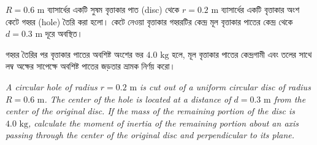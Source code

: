 \documentclass[12pt, a4paper]{article}
\begin{document}
\begin{tcolorbox}[questionbox={প্রশ্ন (Question) 18}]
\noindent
$R = 0.6\text{ m}$ ব্যাসার্ধের একটি সুষম বৃত্তাকার পাত (disc) থেকে $r = 0.2\text{ m}$ ব্যাসার্ধের একটি বৃত্তাকার অংশ কেটে গহ্বর (hole) তৈরি করা হলো। কেটে নেওয়া বৃত্তাকার গহ্বরটির কেন্দ্র মূল বৃত্তাকার পাতের কেন্দ্র থেকে $d = 0.3\text{ m}$ দূরে অবস্থিত। 

\vspace{0.3em}
\noindent
গহ্বর তৈরির পর বৃত্তাকার পাতের অবশিষ্ট অংশের ভর $4.0\text{ kg}$ হলে, মূল বৃত্তাকার পাতের কেন্দ্রগামী এবং তলের সাথে লম্ব অক্ষের সাপেক্ষে অবশিষ্ট পাতের জড়তার ভ্রামক নির্ণয় করো।

\vspace{0.8em}
\begin{english}
\noindent\textit{\color{darkgray}
A circular hole of radius $r = 0.2\text{ m}$ is cut out of a uniform circular disc of radius $R = 0.6\text{ m}$. The center of the hole is located at a distance of $d = 0.3\text{ m}$ from the center of the original disc. If the mass of the remaining portion of the disc is $4.0\text{ kg}$, calculate the moment of inertia of the remaining portion about an axis passing through the center of the original disc and perpendicular to its plane.
}
\end{english}
\end{tcolorbox}


\begin{center}
\end{center}
\end{document}
